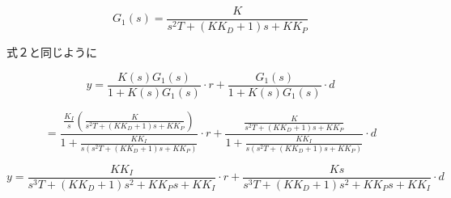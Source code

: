 \documentclass[xelatex,ja=standard,jafont=noto]{bxjsarticle}
\begin{document}
\begin{equation}
    G_{1}(s)=\frac{K}{s^{2}T+(KK_{D}+1)s+KK_{P}}
\end{equation}

式２と同じように

\begin{equation}
    y=\frac{K(s)G_{1}(s)}{1+K(s)G_{1}(s)}\cdot r+\frac{G_{1}(s)}{1+K(s)G_{1}(s)}\cdot d
    \end{equation}
    
\begin{equation}
    =\frac{\frac{K_{I}}{s}(\frac{K}{s^{2}T+(KK_{D}+1)s+KK_{P}})}{1+\frac{KK_{I}}{s(s^{2}T+(KK_{D}+1)s+KK_{P})}}\cdot r+\frac{\frac{K}{s^{2}T+(KK_{D}+1)s+KK_{P}}}{1+\frac{KK_{I}}{s(s^{2}T+(KK_{D}+1)s+KK_{P})}}\cdot d
\end{equation}

    
\begin{equation}
    y=\frac{KK_{I}}{s^{3}T+(KK_{D}+1)s^{2}+KK_{P}s+KK_{I}}\cdot r+\frac{Ks}{s^{3}T+(KK_{D}+1)s^{2}+KK_{P}s+KK_{I}}\cdot d
\end{equation}
		
	
\end{document}
